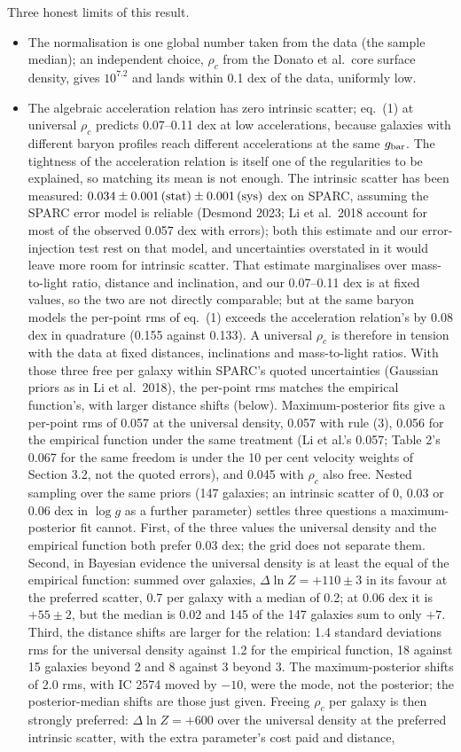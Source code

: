 \documentclass[
  10pt,
]{article}
\begin{document}
Three honest limits of this result.
\begin{itemize}
\item[(i)] The normalisation is one global number taken from the data (the sample median); an independent choice, $\rho_c$ from the Donato et al.~core surface density, gives $10^{7.2}$ and lands within 0.1 dex of the data, uniformly low.
\item[(ii)] The algebraic acceleration relation has zero intrinsic scatter; eq.~(1) at universal $\rho_c$ predicts 0.07--0.11 dex at low accelerations, because galaxies with different baryon profiles reach different accelerations at the same $g_{\rm bar}$. The tightness of the acceleration relation is itself one of the regularities to be explained, so matching its mean is not enough. The intrinsic scatter has been measured: $0.034\pm0.001\,{\rm(stat)}\pm0.001\,{\rm(sys)}$ dex on SPARC, assuming the SPARC error model is reliable (Desmond 2023; Li et al.~2018 account for most of the observed 0.057 dex with errors); both this estimate and our error-injection test rest on that model, and uncertainties overstated in it would leave more room for intrinsic scatter. That estimate marginalises over mass-to-light ratio, distance and inclination, and our 0.07--0.11 dex is at fixed values, so the two are not directly comparable; but at the same baryon models the per-point rms of eq.~(1) exceeds the acceleration relation's by 0.08 dex in quadrature (0.155 against 0.133). A universal $\rho_c$ is therefore in tension with the data at fixed distances, inclinations and mass-to-light ratios. With those three free per galaxy within SPARC's quoted uncertainties (Gaussian priors as in Li et al.~2018), the per-point rms matches the empirical function's, with larger distance shifts (below). Maximum-posterior fits give a per-point rms of 0.057 at the universal density, 0.057 with rule (3), 0.056 for the empirical function under the same treatment (Li et al.'s 0.057; Table 2's 0.067 for the same freedom is under the 10 per cent velocity weights of Section 3.2, not the quoted errors), and 0.045 with $\rho_c$ also free. Nested sampling over the same priors (147 galaxies; an intrinsic scatter of 0, 0.03 or 0.06 dex in $\log g$ as a further parameter) settles three questions a maximum-posterior fit cannot. First, of the three values the universal density and the empirical function both prefer 0.03 dex; the grid does not separate them. Second, in Bayesian evidence the universal density is at least the equal of the empirical function: summed over galaxies, $\Delta\ln Z=+110\pm3$ in its favour at the preferred scatter, 0.7 per galaxy with a median of 0.2; at 0.06 dex it is $+55\pm2$, but the median is 0.02 and 145 of the 147 galaxies sum to only $+7$. Third, the distance shifts are larger for the relation: 1.4 standard deviations rms for the universal density against 1.2 for the empirical function, 18 against 15 galaxies beyond 2 and 8 against 3 beyond 3. The maximum-posterior shifts of 2.0 rms, with IC 2574 moved by $-10$, were the mode, not the posterior; the posterior-median shifts are those just given. Freeing $\rho_c$ per galaxy is then strongly preferred: $\Delta\ln Z=+600$ over the universal density at the preferred intrinsic scatter, with the extra parameter's cost paid and distance, 
\end{itemize}
\end{document}
